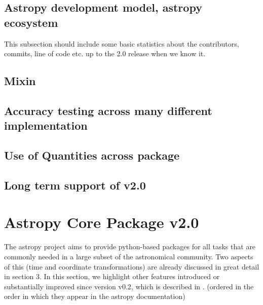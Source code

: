 \documentclass[modern]{aastex61}
\begin{document}
\subsection{Astropy development model, astropy ecosystem}
This subsection should include some basic statistics about the contributors, commits, line of code etc. up to the 2.0 release when we know it.

\subsection{Mixin}

\subsection{Accuracy testing across many different implementation}

\subsection{Use of Quantities across package}

\subsection{Long term support of v2.0}


\section{Astropy Core Package v2.0}

The astropy project aims to provide python-based packages for all tasks that are commonly needed in a large subset of the astronomical community. Two aspects of this (time and coordinate transformations) are already discussed in great detail in section 3. In this section, we highlight other features introduced or substantially improved since version v0.2, which is described in \citet{2013A&A...558A..33A}.
(ordered in the order in which they appear in the astropy documentation)

\end{document}

